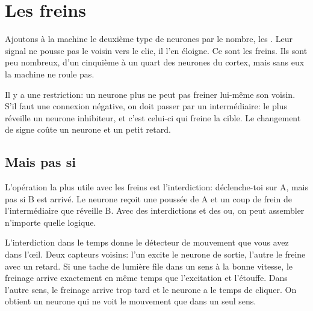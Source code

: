 \chapter{Les freins}

Ajoutons à la machine le deuxième type de neurones par le nombre, les . Leur signal ne pousse pas le voisin vers le clic, il l'en éloigne. Ce sont les freins. Ils sont peu nombreux, d'un cinquième à un quart des neurones du cortex, mais sans eux la machine ne roule pas.

Il y a une restriction: un neurone \og plus\fg{} ne peut pas freiner lui-même son voisin. S'il faut une connexion négative, on doit passer par un intermédiaire: le \og plus\fg{} réveille un neurone inhibiteur, et c'est celui-ci qui freine la cible. Le changement de signe coûte un neurone et un petit retard.

\section*{\og Mais pas si\fg{}}

L'opération la plus utile avec les freins est l'interdiction: \og déclenche-toi sur A, mais pas si B est arrivé\fg{}. Le neurone reçoit une poussée de A et un coup de frein de l'intermédiaire que réveille B. Avec des interdictions et des \og ou\fg{}, on peut assembler n'importe quelle logique.


L'interdiction dans le temps donne le détecteur de mouvement que vous avez dans l'œil. Deux capteurs voisins: l'un excite le neurone de sortie, l'autre le freine avec un retard. Si une tache de lumière file dans un sens à la bonne vitesse, le freinage arrive exactement en même temps que l'excitation et l'étouffe. Dans l'autre sens, le freinage arrive trop tard et le neurone a le temps de cliquer. On obtient un neurone qui ne voit le mouvement que dans un seul sens.

